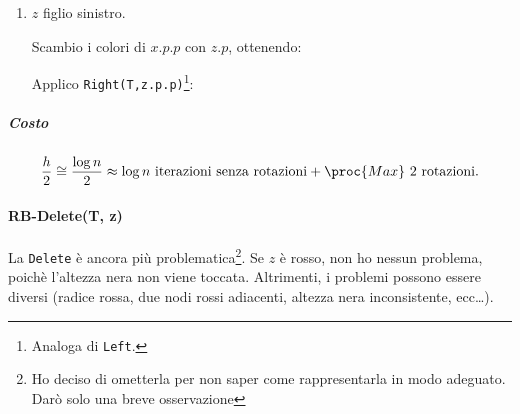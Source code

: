 \begin{enumerate}
\begin{enumerate}[label=($2.\arabic*$)]
        \item $z$ figlio sinistro. \label{rbinsert:2.2}
        \begin{center}
        \end{center}
        Scambio i colori di $x.p.p$ con $z.p$, ottenendo:
        \begin{center}
        \end{center}
        Applico \texttt{Right(T,z.p.p)}\footnote{Analoga di \texttt{Left}.}:
        \begin{center}
        \end{center}
    \end{enumerate}
\end{enumerate}




\subparagraph{Costo}
$$\frac{h}{2} \cong \frac{\log n}{2} \approx \log n \text{ iterazioni senza rotazioni}
    + \proc{Max} \text{ 2 rotazioni.}$$

\paragraph{RB-Delete(T, z)}
La \texttt{Delete} è ancora più problematica\footnote{Ho deciso di ometterla per non saper come rappresentarla in modo adeguato.%
Darò solo una breve osservazione}. Se $z$ è rosso, non ho nessun problema, poichè l'altezza nera non viene toccata.
Altrimenti, i problemi possono essere diversi (radice rossa, due nodi rossi adiacenti, altezza nera inconsistente, ecc\dots).